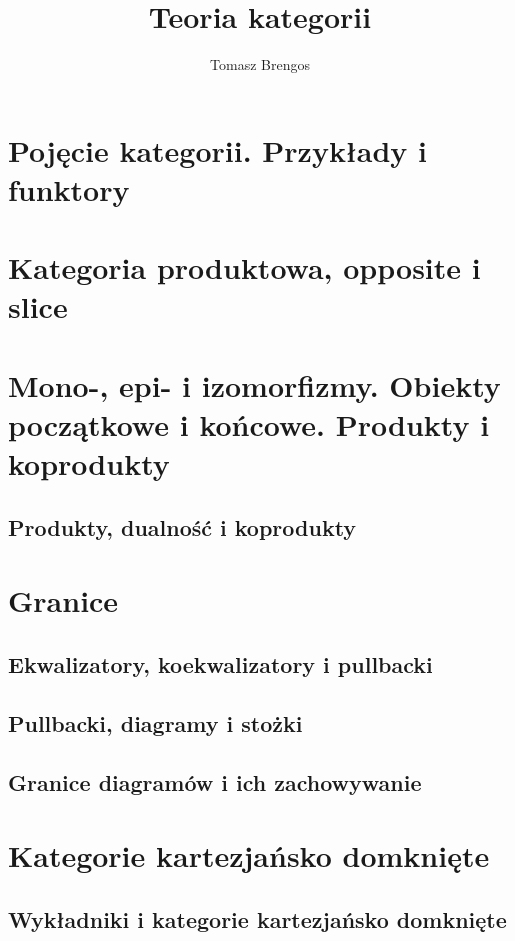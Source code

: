 \documentclass[10pt,a4paper,twoside,openany,parskip=half]{scrbook}
\title{\sffamily\bfseries Teoria kategorii}
\author{\sffamily Tomasz Brengos}
\date{}
\theoremstyle{definition}
\theoremstyle{plain}
\begin{document}
\frontmatter
\maketitle
\tableofcontents

\mainmatter

\chapter{Pojęcie kategorii. Przykłady i funktory}\label{ch:pojecie}


\chapter{Kategoria produktowa, opposite i slice}


\chapter{Mono-, epi- i izomorfizmy. Obiekty początkowe i końcowe. Produkty i koprodukty}

\section{Produkty, dualność i koprodukty}


\chapter{Granice}
\section{Ekwalizatory, koekwalizatory i pullbacki}

\section{Pullbacki, diagramy i stożki}

\section{Granice diagramów i ich zachowywanie}


\chapter{Kategorie kartezjańsko domknięte}
\section{Wykładniki i kategorie kartezjańsko domknięte}\label{sec:wykladniki}

\end{document}
